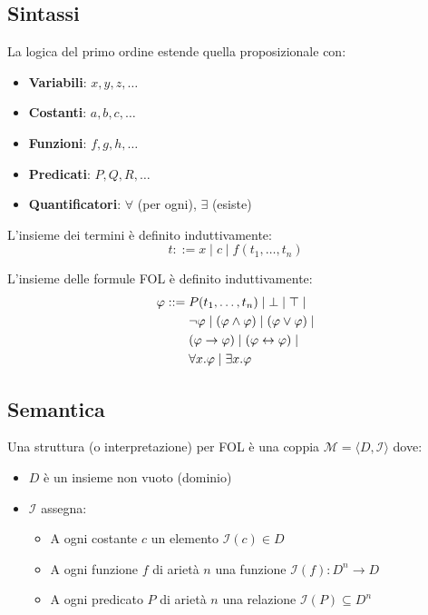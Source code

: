 \subsection{Sintassi}

La logica del primo ordine estende quella proposizionale con:
\begin{itemize}
\item \textbf{Variabili}: $x, y, z, \ldots$
\item \textbf{Costanti}: $a, b, c, \ldots$
\item \textbf{Funzioni}: $f, g, h, \ldots$
\item \textbf{Predicati}: $P, Q, R, \ldots$
\item \textbf{Quantificatori}: $\forall$ (per ogni), $\exists$ (esiste)
\end{itemize}

\begin{definizione}[Termine]
L'insieme dei termini è definito induttivamente:
\begin{equation}
t ::= x \mid c \mid f(t_1, \ldots, t_n)
\end{equation}
\end{definizione}

\begin{definizione}
L'insieme delle formule FOL è definito induttivamente:
\begin{align}
\varphi ::= &\; P(t_1, \ldots, t_n) \mid \bot \mid \top \mid \notag \\
            &\; \neg \varphi \mid (\varphi \land \varphi) \mid (\varphi \lor \varphi) \mid \notag \\
            &\; (\varphi \rightarrow \varphi) \mid (\varphi \leftrightarrow \varphi) \mid \notag \\
            &\; \forall x. \varphi \mid \exists x. \varphi
\end{align}
\end{definizione}

\subsection{Semantica}

\begin{definizione}[Struttura]
Una struttura (o interpretazione) per FOL è una coppia $\mathcal{M} = \langle D, \mathcal{I} \rangle$ dove:
\begin{itemize}
\item $D$ è un insieme non vuoto (dominio)
\item $\mathcal{I}$ assegna:
  \begin{itemize}
  \item A ogni costante $c$ un elemento $\mathcal{I}(c) \in D$
  \item A ogni funzione $f$ di arietà $n$ una funzione $\mathcal{I}(f): D^n \rightarrow D$
  \item A ogni predicato $P$ di arietà $n$ una relazione $\mathcal{I}(P) \subseteq D^n$
  \end{itemize}
\end{itemize}
\end{definizione}


